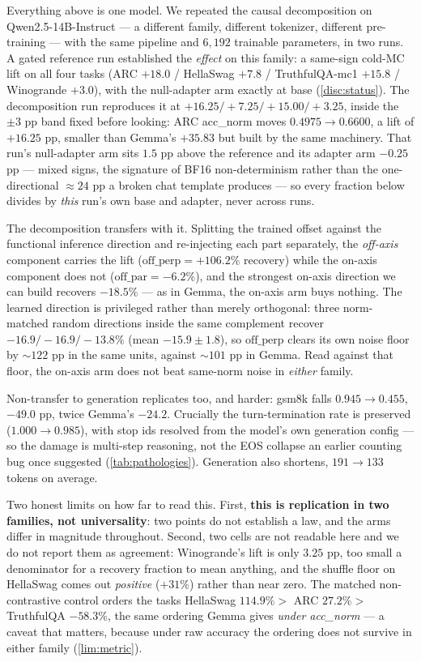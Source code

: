 Everything above is one model. We repeated the causal decomposition on
Qwen2.5-14B-Instruct --- a different family, different tokenizer, different
pre-training --- with the same pipeline and $6{,}192$ trainable parameters, in two
runs. A gated reference run established the \emph{effect} on this family: a same-sign
cold-MC lift on all four tasks (ARC $+18.0$ / HellaSwag $+7.8$ / TruthfulQA-mc1
$+15.8$ / Winogrande $+3.0$), with the null-adapter arm exactly at base
(\cref{disc:status}). The decomposition run reproduces it at
$+16.25 / +7.25 / +15.00 / +3.25$, inside the ${\pm}3$ pp band fixed before looking:
ARC acc\_norm moves $0.4975 \rightarrow 0.6600$, a lift of $\mathbf{+16.25}$ pp,
smaller than Gemma's $+35.83$ but built by the same machinery. That run's
null-adapter arm sits $1.5$ pp above the reference and its adapter arm $-0.25$ pp ---
mixed signs, the signature of BF16 non-determinism rather than the one-directional
${\approx}24$ pp a broken chat template produces --- so every fraction below divides
by \emph{this} run's own base and adapter, never across runs.

The decomposition transfers with it. Splitting the trained offset against the
functional inference direction and re-injecting each part separately, the
\emph{off-axis} component carries the lift ($\text{off\_perp} = \mathbf{+106.2\%}$
recovery) while the on-axis component does not ($\text{off\_par} = -6.2\%$), and the
strongest on-axis direction we can build recovers $-18.5\%$ --- as in Gemma, the
on-axis arm buys nothing. The learned direction is privileged rather than merely
orthogonal: three norm-matched random directions inside the same complement recover
$-16.9 / -16.9 / -13.8\%$ (mean $-15.9 \pm 1.8$), so $\text{off\_perp}$ clears its own
noise floor by ${\sim}122$ pp in the same units, against ${\sim}101$ pp in Gemma.
Read against that floor, the on-axis arm does not beat same-norm noise in
\emph{either} family.

Non-transfer to generation replicates too, and harder: gsm8k falls
$0.945 \rightarrow 0.455$, $\mathbf{-49.0}$ pp, twice Gemma's $-24.2$. Crucially the
turn-termination rate is preserved ($1.000 \rightarrow 0.985$), with stop ids
resolved from the model's own generation config --- so the damage is multi-step
reasoning, not the EOS collapse an earlier counting bug once suggested
(\cref{tab:pathologies}). Generation also shortens, $191 \rightarrow 133$ tokens on
average.

Two honest limits on how far to read this. First, \textbf{this is replication in two
families, not universality}: two points do not establish a law, and the arms differ in
magnitude throughout. Second, two cells are not readable here and we do not report
them as agreement: Winogrande's lift is only $3.25$ pp, too small a denominator for a
recovery fraction to mean anything, and the shuffle floor on HellaSwag comes out
\emph{positive} ($+31\%$) rather than near zero. The matched non-contrastive control orders the tasks
HellaSwag $114.9\% >$ ARC $27.2\% >$ TruthfulQA $-58.3\%$, the same ordering Gemma
gives \emph{under acc\_norm} --- a caveat that matters, because under raw accuracy the
ordering does not survive in either family (\cref{lim:metric}).

